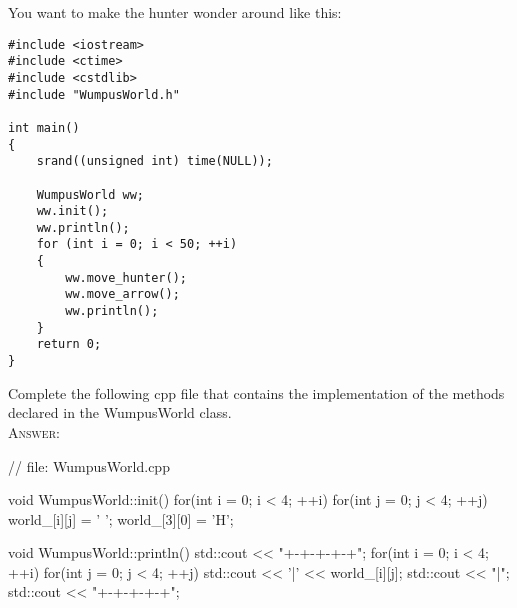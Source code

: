 You want to make the hunter wonder around like this:
\begin{Verbatim}[frame=single,fontsize=\footnotesize]
#include <iostream>
#include <ctime>
#include <cstdlib>
#include "WumpusWorld.h"

int main()
{
    srand((unsigned int) time(NULL));
    
    WumpusWorld ww;
    ww.init();
    ww.println();
    for (int i = 0; i < 50; ++i)
    {
        ww.move_hunter();
        ww.move_arrow();
        ww.println();
    }
    return 0;
}
\end{Verbatim}
Complete the following cpp file that contains the implementation
of the methods declared in the WumpusWorld class.
\\
\textsc{Answer:}\vspace{-2mm}
\begin{answercode}
// file: WumpusWorld.cpp

void WumpusWorld::init()
{
    for(int i = 0; i < 4; ++i)
        for(int j = 0; j < 4; ++j)
        {
            world_[i][j] = ' ';
        }
    world_[3][0] = 'H';
}

void WumpusWorld::println()
{
    std::cout << "+-+-+-+-+\n";
    for(int i = 0; i < 4; ++i)
    {
        for(int j = 0; j < 4; ++j)
        {
            std::cout << '|' << world_[i][j];
        }
        std::cout << "|\n";
        std::cout << "+-+-+-+-+\n";
    }
}


\end{answercode}
